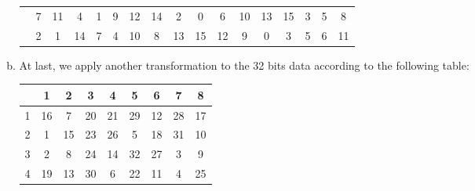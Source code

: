 \documentclass{article}
\begin{document}
\begin{enumerate}
\begin{enumerate}[(a)]
\begin{center}
\begin{tabular}{c|cccccccccccccccc}
& 7 & 11 & 4 & 1 & 9 & 12 & 14 & 2 & 0 & 6 & 10 & 13 & 15 & 3 & 5 & 8 \\  
& 2 & 1 & 14 & 7 & 4 & 10 & 8 & 13 & 15 & 12 & 9 & 0 & 3 & 5 & 6 & 11 \\  
\end{tabular}
\end{center}
\item
At last, we apply another transformation to the 32 bits data according to the following table:
\begin{center}
\begin{tabular}{c|cccccccc}
& 1 & 2 & 3 & 4 & 5 & 6 & 7 & 8 \\
\hline
1 & 16 & 7 & 20 & 21 & 29 & 12 & 28 & 17 \\
2 & 1 & 15 & 23 & 26 & 5 & 18 & 31 & 10 \\
3 & 2 & 8 & 24 & 14 & 32 & 27 & 3 & 9 \\
4 & 19 & 13 & 30 & 6 & 22 & 11 & 4 & 25 \\
\end{tabular}
\end{center}
\end{enumerate}


\end{enumerate}
\end{document}
